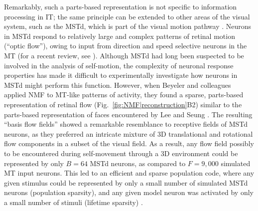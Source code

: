 Remarkably, such a parts-based representation is not specific to
information processing in \ac{IT};
the same principle can be extended to other areas of the visual system,
such as the \ac{MSTd},
which is part of the visual motion pathway \citep{Beyeler2016}.
Neurons in \ac{MSTd} respond to relatively large and complex patterns
of retinal motion (``optic flow''),
owing to input from direction and speed selective neurons in the \ac{MT}
(for a recent review, see \cite{Orban2007}).
Although \ac{MSTd} had long been suspected to be involved in the
analysis of self-motion,
the complexity of neuronal response properties has made it difficult
to experimentally investigate how neurons in \ac{MSTd}
might perform this function.
However, when Beyeler and colleagues \citep{Beyeler2016}
applied \ac{NMF} to \ac{MT}-like patterns of activity,
they found a sparse, parts-based representation of retinal flow
(Fig.~\ref{fig:NMF|reconstruction}B2)
similar to the parts-based representation of faces
encountered by Lee and Seung \cite{LeeSeung1999}.
The resulting ``basis flow fields'' showed a remarkable resemblance to receptive fields
of \ac{MSTd} neurons, as they preferred an intricate mixture of
3D translational and rotational flow components
in a subset of the visual field.
As a result, any flow field possibly to be encountered 
during self-movement through a 3D environment
could be represented by only $B = 64$ \ac{MSTd} neurons,
as compared to $F = 9,000$ simulated \ac{MT} input neurons.
This led to an efficient and sparse population code,
where any given stimulus could be represented
by only a small number of simulated \ac{MSTd} neurons (population sparsity),
and any given model neuron was activated
by only a small number of stimuli (lifetime sparsity)
\citep{Beyeler2016}.




